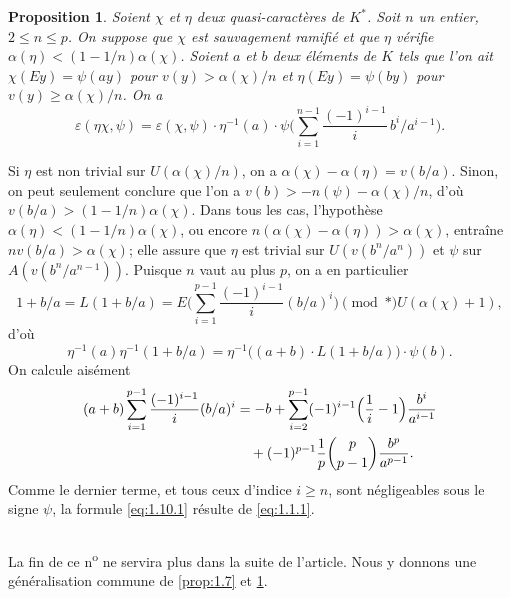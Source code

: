 \documentclass[12pt,a4paper]{article}
\theoremstyle{plain}
\newtheorem{proposition}[theorem]{Proposition}
\theoremstyle{definition}
\theoremstyle{remark}
\begin{document}
\begin{proposition}\label{prop:1.10}
Soient $\chi$ et $\eta$ deux quasi-caract\`eres de $K^*$. Soit $n$ un entier, $2 \leq n \leq p$. On suppose que $\chi$ est sauvagement ramifi\'e et que $\eta$ v\'erifie $\alpha(\eta) < (1-1/n)\alpha(\chi)$. Soient $a$ et $b$ deux \'el\'ements de $K$ tels que l'on ait $\chi(Ey) = \psi(ay)$ pour $v(y) > \alpha(\chi)/n$ et $\eta(Ey) = \psi(by)$ pour $v(y) \geq \alpha(\chi)/n$. On a
\begin{equation}\label{eq:1.10.1}
\varepsilon(\eta\chi, \psi) = \varepsilon(\chi, \psi) \cdot \eta^{-1}(a) \cdot \psi\biggl(\sum_{i=1}^{n-1} \frac{(-1)^{i-1}}{i} \, b^i/a^{i-1}\biggr).
\end{equation}
\end{proposition}

Si $\eta$ est non trivial sur $U(\alpha(\chi)/n)$, on a $\alpha(\chi) - \alpha(\eta) = v(b/a)$. Sinon, on peut seulement conclure que l'on a $v(b) > -n(\psi) - \alpha(\chi)/n$, d'o\`u $v(b/a) > (1-1/n)\alpha(\chi)$. Dans tous les cas, l'hypoth\`ese $\alpha(\eta) < (1-1/n)\alpha(\chi)$, ou encore $n(\alpha(\chi) - \alpha(\eta)) > \alpha(\chi)$, entra\^ine $nv(b/a) > \alpha(\chi)$; elle assure que $\eta$ est trivial sur $U(v(b^n/a^n))$ et $\psi$ sur $A(v(b^n/a^{n-1}))$. Puisque $n$ vaut au plus $p$, on a en particulier
\[
1 + b/a = L(1+b/a) = E\biggl(\sum_{i=1}^{p-1} \frac{(-1)^{i-1}}{i} (b/a)^i\biggr) \pmod{*} U(\alpha(\chi)+1),
\]
d'o\`u
\[
\eta^{-1}(a)\eta^{-1}(1+b/a) = \eta^{-1}\bigl((a+b) \cdot L(1+b/a)\bigr) \cdot \psi(b).
\]
On calcule ais\'ement
\begin{align*}
(a+b) \sum_{i=1}^{p-1} \frac{(-1)^{i-1}}{i} (b/a)^i &= -b + \sum_{i=2}^{p-1} (-1)^{i-1}\Bigl(\frac{1}{i} - 1\Bigr) \frac{b^i}{a^{i-1}} \\
&\quad + (-1)^{p-1}\frac{1}{p}\binom{p}{p-1}\frac{b^p}{a^{p-1}}.
\end{align*}
Comme le dernier terme, et tous ceux d'indice $i \geq n$, sont n\'egligeables sous le signe $\psi$, la formule \eqref{eq:1.10.1} r\'esulte de \eqref{eq:1.1.1}.

\subsection{}
\label{sec:1.11}

La fin de ce n\textsuperscript{o} ne servira plus dans la suite de l'article. Nous y donnons une g\'en\'eralisation commune de \ref{prop:1.7} et \ref{prop:1.10}.
\end{document}

